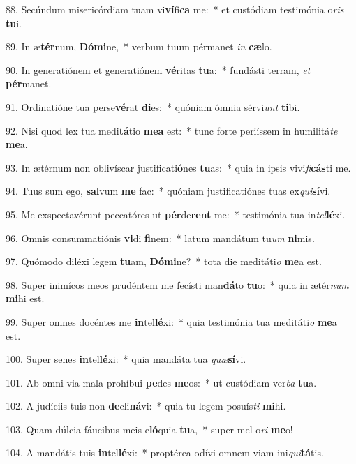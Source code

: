 88. Secúndum misericórdiam tuam vi\textbf{ví}fi\textbf{ca} me:~*  et custódiam testimónia o\textit{ris} \textbf{tu}i.\

89. In æ\textbf{tér}num, \textbf{Dó}\textbf{mi}ne,~*  verbum tuum pérmanet \textit{in} \textbf{cæ}lo.\

90. In generatiónem et generatiónem \textbf{vé}ritas \textbf{tu}a:~*  fundásti terram, \textit{et} \textbf{pér}manet.\

91. Ordinatióne tua perse\textbf{vé}rat \textbf{di}es:~*  quóniam ómnia sérvi\textit{unt} \textbf{ti}bi.\

92. Nisi quod lex tua medi\textbf{tá}tio \textbf{me}\textbf{a} est:~*  tunc forte periíssem in humilitá\textit{te} \textbf{me}a.\

93. In ætérnum non oblivíscar justificati\textbf{ó}nes \textbf{tu}as:~*  quia in ipsis vivi\textit{fi}\textbf{cás}ti me.\

94. Tuus sum ego, \textbf{sal}vum \textbf{me} fac:~*  quóniam justificatiónes tuas ex\textit{qui}\textbf{sí}vi.\

95. Me exspectavérunt peccatóres ut \textbf{pér}de\textbf{rent} me:~*  testimónia tua in\textit{tel}\textbf{lé}xi.\

96. Omnis consummatiónis \textbf{vi}di \textbf{fi}nem:~*  latum mandátum tu\textit{um} \textbf{ni}mis.\

97. Quómodo diléxi legem \textbf{tu}am, \textbf{Dó}\textbf{mi}ne?~*  tota die meditáti\textit{o} \textbf{me}a est.\

98. Super inimícos meos prudéntem me fecísti man\textbf{dá}to \textbf{tu}o:~*  quia in ætér\textit{num} \textbf{mi}hi est.\

99. Super omnes docéntes me \textbf{in}tel\textbf{lé}xi:~*  quia testimónia tua meditáti\textit{o} \textbf{me}a est.\

100. Super senes \textbf{in}tel\textbf{lé}xi:~*  quia mandáta tua \textit{quæ}\textbf{sí}vi.\

101. Ab omni via mala prohíbui \textbf{pe}des \textbf{me}os:~*  ut custódiam ver\textit{ba} \textbf{tu}a.\

102. A judíciis tuis non \textbf{de}cli\textbf{ná}vi:~*  quia tu legem posuís\textit{ti} \textbf{mi}hi.\

103. Quam dúlcia fáucibus meis e\textbf{ló}quia \textbf{tu}a,~*  super mel o\textit{ri} \textbf{me}o!\

104. A mandátis tuis \textbf{in}tel\textbf{lé}xi:~*  proptérea odívi omnem viam ini\textit{qui}\textbf{tá}tis.\

